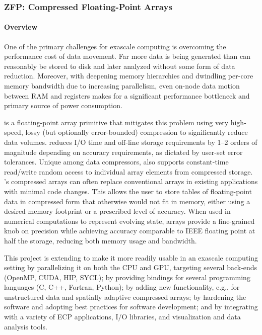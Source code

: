 \newcommand{\zfpmilestone}[1]{~(STDM16-#1)}

\subsubsection{ ZFP: Compressed Floating-Point Arrays}

\paragraph{Overview} 

One of the primary challenges for exascale computing is overcoming the performance cost of data movement.  
Far more data is being generated than can reasonably be stored to disk and later analyzed without some form of data reduction.  
Moreover, with deepening memory hierarchies and dwindling per-core memory bandwidth due to increasing parallelism, even on-node data motion between RAM and registers makes for a significant performance bottleneck and primary source of power consumption.

{\zfp} is a floating-point array primitive that mitigates this problem using
very high-speed, lossy (but optionally error-bounded) compression to
significantly reduce data volumes.  {\zfp} reduces I/O time and off-line
storage requirements by 1--2 orders of magnitude depending on accuracy
requirements, as dictated by user-set error tolerances.  Unique among data
compressors, {\zfp} also supports constant-time read/write random access to
individual array elements from compressed storage.  {\zfp}'s compressed arrays
can often replace conventional arrays in existing applications with minimal
code changes.  This allows the user to store tables of floating-point
data in compressed form that otherwise would not fit in memory, either using
a desired memory footprint or a prescribed level of accuracy.  When used in
numerical computations to represent evolving state, {\zfp} arrays provide a
fine-grained knob on precision while achieving accuracy comparable to IEEE
floating point at half the storage, reducing both memory usage and bandwidth.

This project is extending {\zfp} to make it more readily usable in an exascale
computing setting by parallelizing it on both the CPU and GPU, targeting
several back-ends (OpenMP, CUDA, HIP, SYCL); by providing bindings for several
programming languages (C, C++, Fortran, Python); by adding new functionality,
e.g., for unstructured data and spatially adaptive compressed arrays; by
hardening the software and adopting best practices for software development;
and by integrating {\zfp} with a variety of ECP applications, I/O libraries,
and visualization and data analysis tools.


